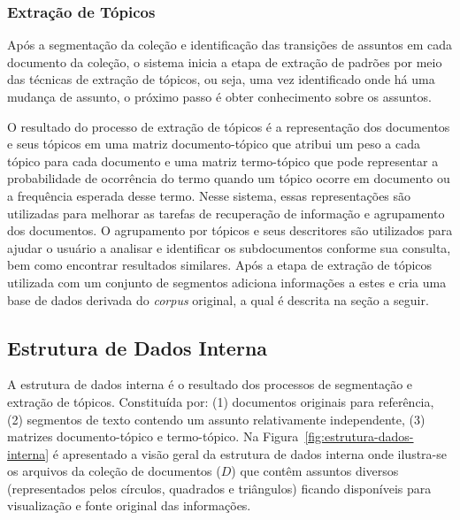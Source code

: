 




\subsubsection{Extração de Tópicos}

Após a segmentação da coleção e identificação das transições de assuntos em cada documento da coleção, o sistema inicia a etapa de extração de padrões por meio das técnicas de extração de tópicos, ou seja, uma vez identificado onde há uma mudança de assunto, o próximo passo é obter conhecimento sobre os assuntos.

O resultado do processo de extração de tópicos é a representação dos documentos e seus tópicos em uma matriz documento-tópico que atribui um peso a cada tópico para cada documento e uma matriz termo-tópico que pode representar a probabilidade de ocorrência do termo quando um tópico ocorre em documento ou a frequência esperada desse termo.  
Nesse sistema, essas representações são utilizadas para melhorar as tarefas de recuperação de informação e agrupamento dos documentos. 
O agrupamento por tópicos e seus descritores são utilizados para ajudar o usuário a analisar e identificar os subdocumentos conforme sua consulta, bem como encontrar resultados similares. Após a etapa de extração de tópicos utilizada com um conjunto de segmentos adiciona informações a estes e cria uma base de dados derivada do \textit{corpus} original, a qual é descrita na seção a seguir.








\subsection{Estrutura de Dados Interna}

A estrutura de dados interna é o resultado dos processos de segmentação e extração de tópicos. Constituída por: 
(1) documentos originais para referência, 
(2) segmentos de texto contendo um assunto relativamente independente,
(3) matrizes documento-tópico e termo-tópico.
Na Figura~\ref{fig:estrutura-dados-interna} é apresentado a visão geral da estrutura de dados interna onde ilustra-se os arquivos da coleção de documentos ($D$) que contêm assuntos diversos (representados pelos círculos, quadrados e triângulos) ficando disponíveis para visualização e fonte original das informações. 


